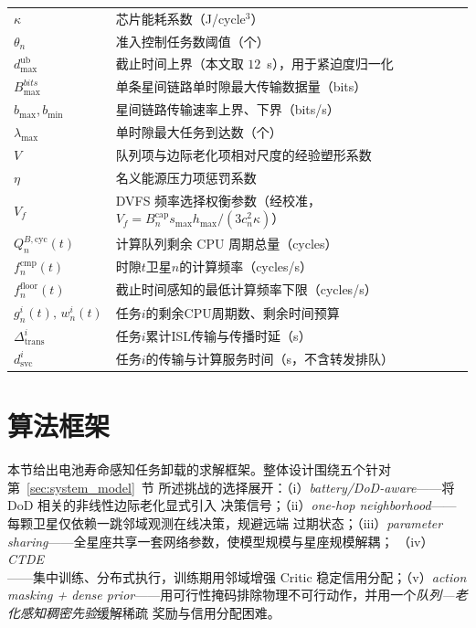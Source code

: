 \documentclass[a4paper,11pt]{article}
\begin{document}
\begin{table}[t]
\begin{tabular}{ll}
$\kappa$ & 芯片能耗系数（J/cycle$^3$） \\
$\theta_n$ & 准入控制任务数阈值（个） \\
$d^{\mathrm{ub}}_{\max}$ & 截止时间上界（本文取 $12$~s），用于紧迫度归一化 \\
$B^{bits}_{\max}$ & 单条星间链路单时隙最大传输数据量（bits） \\
$b_{\max}, b_{\min}$ & 星间链路传输速率上界、下界（bits/s） \\
$\lambda_{\max}$ & 单时隙最大任务到达数（个） \\
$V$ & 队列项与边际老化项相对尺度的经验塑形系数 \\
$\eta$ & 名义能源压力项惩罚系数 \\
$V_f$ & DVFS 频率选择权衡参数（经校准，$V_f=B^{\mathrm{cap}}_n s_{\max} h_{\max}/(3c_n^2\kappa)$） \\
$Q^{B,\mathrm{cyc}}_n(t)$ & 计算队列剩余 CPU 周期总量（cycles） \\
$f^{\mathrm{cmp}}_n(t)$ & 时隙$t$卫星$n$的计算频率（cycles/s） \\
$f^{\mathrm{floor}}_n(t)$ & 截止时间感知的最低计算频率下限（cycles/s） \\
$g^i_n(t),\,w^i_n(t)$ & 任务$i$的剩余CPU周期数、剩余时间预算 \\
$\Delta^i_{\mathrm{trans}}$ & 任务$i$累计ISL传输与传播时延（s） \\
$d^i_{\mathrm{svc}}$ & 任务$i$的传输与计算服务时间（s，不含转发排队） \\
\bottomrule
\end{tabular}
\end{table}

\section{算法框架}
\label{sec:algorithm}

本节给出电池寿命感知任务卸载的求解框架。整体设计围绕五个针对第~\ref{sec:system_model}~节
所述挑战的选择展开：（i）\emph{battery/DoD-aware}——将 DoD 相关的非线性边际老化显式引入
决策信号；（ii）\emph{one-hop neighborhood}——每颗卫星仅依赖一跳邻域观测在线决策，规避远端
过期状态；（iii）\emph{parameter sharing}——全星座共享一套网络参数，使模型规模与星座规模解耦；
（iv）\emph{CTDE}——集中训练、分布式执行，训练期用邻域增强 Critic 稳定信用分配；（v）\emph{action
masking + dense prior}——用可行性掩码排除物理不可行动作，并用一个\emph{队列—老化感知稠密先验}缓解稀疏
奖励与信用分配困难。
\end{document}
